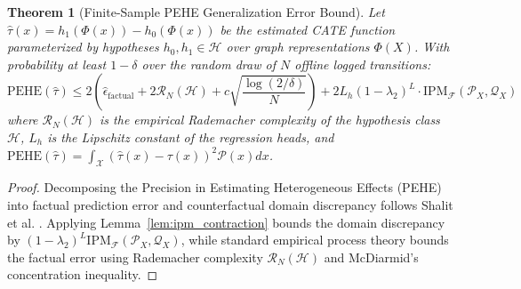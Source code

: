 \documentclass[preprint,12pt,3p]{elsarticle}
\newtheorem{theorem}{Theorem}
\begin{document}
\begin{theorem}[Finite-Sample PEHE Generalization Error Bound]
\label{thm:pehe_bound}
Let $\hat{\tau}(x) = h_1(\Phi(x)) - h_0(\Phi(x))$ be the estimated CATE function parameterized by hypotheses $h_0, h_1 \in \mathcal{H}$ over graph representations $\Phi(X)$. With probability at least $1 - \delta$ over the random draw of $N$ offline logged transitions:
\begin{equation}
\mathrm{PEHE}(\hat{\tau}) \le 2 \left( \hat{\epsilon}_{\mathrm{factual}} + 2 \mathcal{R}_N(\mathcal{H}) + c \sqrt{\frac{\log(2/\delta)}{N}} \right) + 2 L_h (1 - \lambda_2)^L \cdot \mathrm{IPM}_{\mathcal{F}}(\mathcal{P}_X, \mathcal{Q}_X)
\end{equation}
where $\mathcal{R}_N(\mathcal{H})$ is the empirical Rademacher complexity of the hypothesis class $\mathcal{H}$, $L_h$ is the Lipschitz constant of the regression heads, and $\mathrm{PEHE}(\hat{\tau}) = \int_{\mathcal{X}} (\hat{\tau}(x) - \tau(x))^2 \mathcal{P}(x) dx$.
\end{theorem}
\begin{proof}
Decomposing the Precision in Estimating Heterogeneous Effects (PEHE) into factual prediction error and counterfactual domain discrepancy follows Shalit et al. \cite{shalit2017estimating}. Applying Lemma~\ref{lem:ipm_contraction} bounds the domain discrepancy by $(1 - \lambda_2)^L \mathrm{IPM}_{\mathcal{F}}(\mathcal{P}_X, \mathcal{Q}_X)$, while standard empirical process theory bounds the factual error using Rademacher complexity $\mathcal{R}_N(\mathcal{H})$ and McDiarmid's concentration inequality.
\end{proof}
\end{document}

